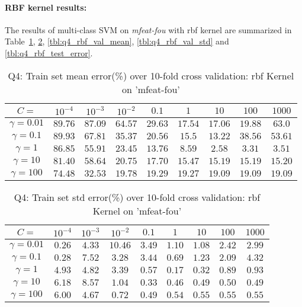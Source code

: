 \paragraph{RBF kernel results:}The results of multi-class SVM on \textit{mfeat-fou} with rbf kernel are summarized in Table~\ref{tbl:q4_rbf_train_mean}, \ref{tbl:q4_rbf_train_std}, \ref{tbl:q4_rbf_val_mean}, \ref{tbl:q4_rbf_val_std} and \ref{tbl:q4_rbf_test_error}.
\begin{table}[ht]
	\centering
	\caption{Q4: Train set mean error(\%) over 10-fold cross validation: rbf Kernel on 'mfeat-fou'}
	\begin{tabular}[t]{ccccccccc} 
		\hline
		$C=$ 						& $10^{-4}$ & $10^{-3}$ & $10^{-2}$ & $0.1$ 	& $1$ 		& $10$ 		& $100$ 	& $1000$\\ [0.5ex] 
		\hline
		$\gamma=0.01$ 				& $89.76$ 	& $87.09$ 	& $64.57$ 	& $29.63$ 	& $17.54$ 	& $17.06$ 	& $19.88$ 	& $63.0$\\
		$\gamma=0.1$ 				& $89.93$ 	& $67.81$ 	& $35.37$ 	& $20.56$ 	& $15.5$ 	& $13.22$ 	& $38.56$ 	& $53.61$\\
		$\gamma=1$ 					& $86.85$ 	& $55.91$ 	& $23.45$ 	& $13.76$ 	& $8.59$ 	& $2.58$ 	& $3.31$ 	& $3.51$\\
		$\gamma=10$ 				& $81.40$ 	& $58.64$ 	& $20.75$ 	& $17.70$ 	& $15.47$ 	& $15.19$ 	& $15.19$ 	& $15.20$\\
		$\gamma=100$ 				& $74.48$ 	& $32.53$ 	& $19.78$ 	& $19.29$ 	& $19.27$ 	& $19.09$ 	& $19.09$ 	& $19.09$\\[1ex]
		\hline
	\end{tabular}
	\label{tbl:q4_rbf_train_mean}
\end{table}
\begin{table}[ht]
	\centering
	\caption{Q4: Train set std error(\%) over 10-fold cross validation: rbf Kernel on 'mfeat-fou'}
	\begin{tabular}[t]{ccccccccc} 
		\hline
		$C=$ 						& $10^{-4}$ & $10^{-3}$ & $10^{-2}$ & $0.1$ 	& $1$ 		& $10$ 		& $100$ 	& $1000$\\ [0.5ex] 
		\hline
		$\gamma=0.01$ 				& $0.26$ 	& $4.33$ 	& $10.46$ 	& $3.49$ 	& $1.10$ 	& $1.08$ 	& $2.42$ 	& $2.99$\\
		$\gamma=0.1$ 				& $0.28$ 	& $7.52$ 	& $3.28$ 	& $3.44$ 	& $0.69$ 	& $1.23$ 	& $2.09$ 	& $4.32$\\
		$\gamma=1$ 					& $4.93$ 	& $4.82$ 	& $3.39$ 	& $0.57$ 	& $0.17$ 	& $0.32$ 	& $0.89$ 	& $0.93$\\
		$\gamma=10$ 				& $6.18$ 	& $8.57$ 	& $1.04$ 	& $0.33$ 	& $0.46$ 	& $0.49$ 	& $0.50$ 	& $0.49$\\
		$\gamma=100$ 				& $6.00$ 	& $4.67$ 	& $0.72$ 	& $0.49$ 	& $0.54$ 	& $0.55$ 	& $0.55$ 	& $0.55$\\[1ex]
		\hline
	\end{tabular}
	\label{tbl:q4_rbf_train_std}
\end{table}
